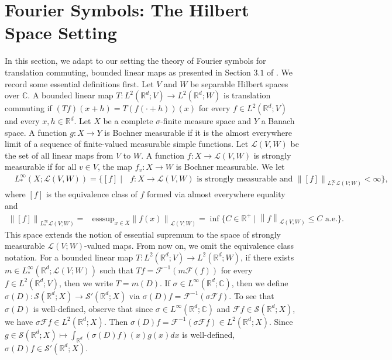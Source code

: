 \documentclass[11pt,letterpaper,reqno]{amsart}
\numberwithin{equation}{section}
\newcommand{\norm}[1]{\left\lVert#1\right\rVert}
\begin{document}
\section{Fourier Symbols: The Hilbert Space Setting} \label{fst}
In this section, we adapt to our setting the theory of Fourier symbols for translation commuting, bounded linear maps as presented in Section \(3.1\) of \cite{MR4787851}. We record some essential definitions first. Let \(V\) and \(W\) be separable Hilbert spaces over \(\mathbb{C}\). A bounded linear map \(T:L^{2}(\mathbb{R}^{d};V) \to L^{2}(\mathbb{R}^{d};W)\) is translation commuting if \((Tf)(x + h)=T(f(\cdot + h))(x)\) for every \(f \in L^{2}(\mathbb{R}^{d};V)\) and every \(x, h \in \mathbb{R}^{d}\). Let \(X\) be a complete \(\sigma\)-finite measure space and \(Y\) a Banach space. A function \(g:X \to Y\) is Bochner measurable if it is the almost everywhere limit of a sequence of finite-valued measurable simple functions. Let \(\mathcal{L}(V,W)\) be the set of all linear maps from \(V\) to \(W\). A function \(f: X \to \mathcal{L}(V,W)\) is strongly measurable if for all \(v \in V\), the map \(f_{v}: X \to W\) is Bochner measurable. We let
\begin{align}
    &L_{*}^{\infty}(X;\mathcal{L}(V,W)) =\{[f]\mid \mbox{ \(f: X \to \mathcal{L}(V,W)\) is strongly measurable and \(\norm{[f]}_{L_{*}^{\infty}\mathcal{L}(V;W)}<\infty\)}\},
\end{align}
where \([f]\) is the equivalence class of \(f\) formed via almost everywhere equality and
\begin{align}
    \norm{[f]}_{L_{*}^{\infty}\mathcal{L}(V;W)}=&\mbox{esssup}_{x \in X}\norm{f(x)}_{\mathcal{L}(V;W)} =\inf\{\mbox{\(C \in \mathbb{R}^{+} \mid \norm{f}_{\mathcal{L}(V;W)} \leq C\) a.e.}\}.
\end{align}
This space extends the notion of essential supremum to the space of strongly measurable \(\mathcal{L}(V;W)\)-valued maps. From now on, we omit the equivalence class notation. For a bounded linear map \(T: L^{2}(\mathbb{R}^{d};V) \to L^{2}(\mathbb{R}^{d};W)\), if there exists \(m \in L^{\infty}_{*}(\mathbb{R}^{d};\mathcal{L}(V;W))\) such that \(Tf=\mathcal{F}^{-1}(m\mathcal{F}(f))\) for every \(f\in L^{2}(\mathbb{R}^{d};V)\), then we write \(T=m(D)\). If \(\sigma \in L^{\infty}(\mathbb{R}^{d};\mathbb{C})\), then we define \(\sigma(D): \mathscr{S}(\mathbb{R}^{d};X) \to \mathscr{S}'(\mathbb{R}^{d};X)\) via \(\sigma(D)f=\mathcal{F}^{-1}(\sigma\mathcal{F}f)\). To see that \(\sigma(D)\) is well-defined, observe that since \(\sigma \in L^{\infty}(\mathbb{R}^{d};\mathbb{C})\) and \(\mathcal{F}f \in \mathscr{S}(\mathbb{R}^{d};X)\), we have \(\sigma\mathcal{F}f \in L^{2}(\mathbb{R}^{d};X)\). Then \(\sigma(D)f=\mathcal{F}^{-1}(\sigma\mathcal{F}f) \in L^{2}(\mathbb{R}^{d};X)\). Since \(g \in \mathscr{S}(\mathbb{R}^{d};X) \mapsto \int_{\mathbb{R}^{d}}(\sigma(D)f)(x)g(x)dx\) is well-defined, \(\sigma(D)f \in \mathscr{S}'(\mathbb{R}^{d};X)\).
\end{document}
